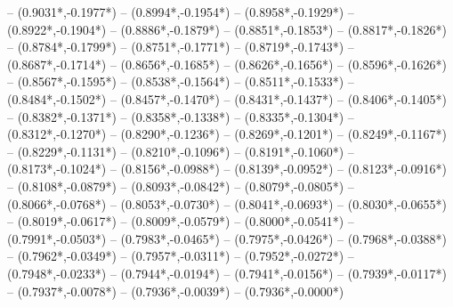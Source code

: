 {	-- ({0.9031*\dx},{-0.1977*\dy})
	-- ({0.8994*\dx},{-0.1954*\dy})
	-- ({0.8958*\dx},{-0.1929*\dy})
	-- ({0.8922*\dx},{-0.1904*\dy})
	-- ({0.8886*\dx},{-0.1879*\dy})
	-- ({0.8851*\dx},{-0.1853*\dy})
	-- ({0.8817*\dx},{-0.1826*\dy})
	-- ({0.8784*\dx},{-0.1799*\dy})
	-- ({0.8751*\dx},{-0.1771*\dy})
	-- ({0.8719*\dx},{-0.1743*\dy})
	-- ({0.8687*\dx},{-0.1714*\dy})
	-- ({0.8656*\dx},{-0.1685*\dy})
	-- ({0.8626*\dx},{-0.1656*\dy})
	-- ({0.8596*\dx},{-0.1626*\dy})
	-- ({0.8567*\dx},{-0.1595*\dy})
	-- ({0.8538*\dx},{-0.1564*\dy})
	-- ({0.8511*\dx},{-0.1533*\dy})
	-- ({0.8484*\dx},{-0.1502*\dy})
	-- ({0.8457*\dx},{-0.1470*\dy})
	-- ({0.8431*\dx},{-0.1437*\dy})
	-- ({0.8406*\dx},{-0.1405*\dy})
	-- ({0.8382*\dx},{-0.1371*\dy})
	-- ({0.8358*\dx},{-0.1338*\dy})
	-- ({0.8335*\dx},{-0.1304*\dy})
	-- ({0.8312*\dx},{-0.1270*\dy})
	-- ({0.8290*\dx},{-0.1236*\dy})
	-- ({0.8269*\dx},{-0.1201*\dy})
	-- ({0.8249*\dx},{-0.1167*\dy})
	-- ({0.8229*\dx},{-0.1131*\dy})
	-- ({0.8210*\dx},{-0.1096*\dy})
	-- ({0.8191*\dx},{-0.1060*\dy})
	-- ({0.8173*\dx},{-0.1024*\dy})
	-- ({0.8156*\dx},{-0.0988*\dy})
	-- ({0.8139*\dx},{-0.0952*\dy})
	-- ({0.8123*\dx},{-0.0916*\dy})
	-- ({0.8108*\dx},{-0.0879*\dy})
	-- ({0.8093*\dx},{-0.0842*\dy})
	-- ({0.8079*\dx},{-0.0805*\dy})
	-- ({0.8066*\dx},{-0.0768*\dy})
	-- ({0.8053*\dx},{-0.0730*\dy})
	-- ({0.8041*\dx},{-0.0693*\dy})
	-- ({0.8030*\dx},{-0.0655*\dy})
	-- ({0.8019*\dx},{-0.0617*\dy})
	-- ({0.8009*\dx},{-0.0579*\dy})
	-- ({0.8000*\dx},{-0.0541*\dy})
	-- ({0.7991*\dx},{-0.0503*\dy})
	-- ({0.7983*\dx},{-0.0465*\dy})
	-- ({0.7975*\dx},{-0.0426*\dy})
	-- ({0.7968*\dx},{-0.0388*\dy})
	-- ({0.7962*\dx},{-0.0349*\dy})
	-- ({0.7957*\dx},{-0.0311*\dy})
	-- ({0.7952*\dx},{-0.0272*\dy})
	-- ({0.7948*\dx},{-0.0233*\dy})
	-- ({0.7944*\dx},{-0.0194*\dy})
	-- ({0.7941*\dx},{-0.0156*\dy})
	-- ({0.7939*\dx},{-0.0117*\dy})
	-- ({0.7937*\dx},{-0.0078*\dy})
	-- ({0.7936*\dx},{-0.0039*\dy})
	-- ({0.7936*\dx},{-0.0000*\dy})
}
